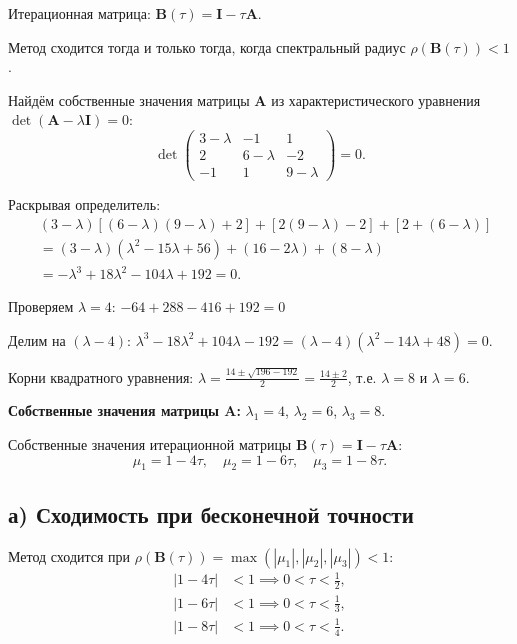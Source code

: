 \documentclass{article}
\begin{document}
Итерационная матрица: $\mathbf{B}(\tau) = \mathbf{I} - \tau\mathbf{A}$.

Метод сходится тогда и только тогда, когда спектральный радиус $\rho(\mathbf{B}(\tau)) < 1$.

Найдём собственные значения матрицы $\mathbf{A}$ из характеристического уравнения $\det(\mathbf{A} - \lambda\mathbf{I}) = 0$:
\begin{equation}
\det\begin{pmatrix} 3-\lambda & -1 & 1 \\ 2 & 6-\lambda & -2 \\ -1 & 1 & 9-\lambda \end{pmatrix} = 0.
\end{equation}

Раскрывая определитель:
\begin{align}
&(3-\lambda)[(6-\lambda)(9-\lambda) + 2] + [2(9-\lambda) - 2] + [2 + (6-\lambda)] \nonumber \\
&= (3-\lambda)(\lambda^2 - 15\lambda + 56) + (16 - 2\lambda) + (8 - \lambda) \nonumber \\
&= -\lambda^3 + 18\lambda^2 - 104\lambda + 192 = 0.
\end{align}

Проверяем $\lambda = 4$: $-64 + 288 - 416 + 192 = 0$ 

Делим на $(\lambda - 4)$: $\lambda^3 - 18\lambda^2 + 104\lambda - 192 = (\lambda - 4)(\lambda^2 - 14\lambda + 48) = 0$.

Корни квадратного уравнения: $\lambda = \frac{14 \pm \sqrt{196 - 192}}{2} = \frac{14 \pm 2}{2}$, т.е. $\lambda = 8$ и $\lambda = 6$.

\textbf{Собственные значения матрицы $\mathbf{A}$:} $\lambda_1 = 4$, $\lambda_2 = 6$, $\lambda_3 = 8$.

Собственные значения итерационной матрицы $\mathbf{B}(\tau) = \mathbf{I} - \tau\mathbf{A}$:
\begin{equation}
\mu_1 = 1 - 4\tau, \quad \mu_2 = 1 - 6\tau, \quad \mu_3 = 1 - 8\tau.
\end{equation}

\subsection*{а) Сходимость при бесконечной точности}

Метод сходится при $\rho(\mathbf{B}(\tau)) = \max(|\mu_1|, |\mu_2|, |\mu_3|) < 1$:
\begin{align}
|1 - 4\tau| &< 1 \implies 0 < \tau < \frac{1}{2}, \\
|1 - 6\tau| &< 1 \implies 0 < \tau < \frac{1}{3}, \\
|1 - 8\tau| &< 1 \implies 0 < \tau < \frac{1}{4}.
\end{align}
\end{document}

